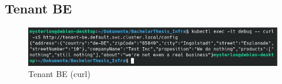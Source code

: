 \documentclass[11pt, a4paper, oneside, listof=totoc]{scrartcl}
\begin{document}
        \clearpage

            \FloatBarrier
            \subsection{Tenant BE}\label{appsub:tenantbe}
                \begin{figure}[h!]
                    \centering
                    \includegraphics[width=\textwidth]{screenshots/eval/tenantbe/curl.png}
                    \caption{Tenant BE (curl)}\label{fig:tenantbe-curl}
                \end{figure}
                
\end{document}
